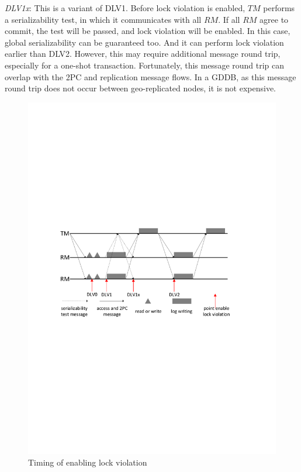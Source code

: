\documentclass[conference]{IEEEtran}
\begin{document}
\emph{DLV1x}:
This is a variant of DLV1.
Before lock violation is enabled, ${TM}$ performs a serializability test, in which it communicates with all ${RM}$.
If all ${RM}$ agree to commit, the test will be passed, and lock violation will be enabled.
In this case, global serializability can be guaranteed too. And it can perform lock violation earlier than DLV2.
However, this may require additional message round trip, especially for a one-shot transaction.
Fortunately, this message round trip can overlap with the 2PC and replication message flows.
In a GDDB, as this message round trip does not occur between geo-replicated nodes, it is not expensive.

\begin{figure}[tbp]
  \centerline{\includegraphics[scale=0.50]{figure/lock_violation_time.pdf}}
  \caption
  {Timing of enabling lock violation}
\label{fig:lock_violation_time}
\end{figure}
\end{document}
